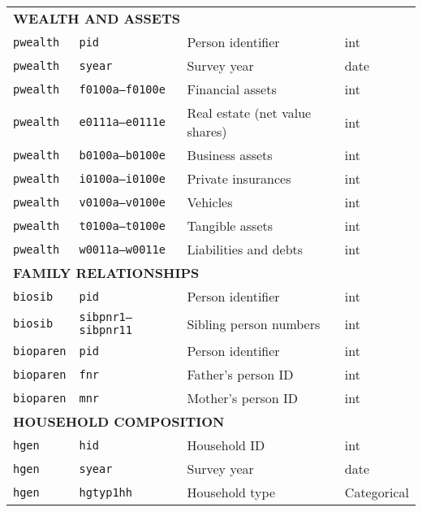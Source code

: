 {\begin{longtable}{llll}
\midrule
\multicolumn{4}{l}{\textbf{WEALTH AND ASSETS}} \\
\texttt{pwealth} & \texttt{pid} & Person identifier & int \\
\texttt{pwealth} & \texttt{syear} & Survey year & date \\
\texttt{pwealth} & \texttt{f0100a--f0100e} & Financial assets & int \\
\texttt{pwealth} & \texttt{e0111a--e0111e} & Real estate (net value shares) & int \\
\texttt{pwealth} & \texttt{b0100a--b0100e} & Business assets & int \\
\texttt{pwealth} & \texttt{i0100a--i0100e} & Private insurances & int \\
\texttt{pwealth} & \texttt{v0100a--v0100e} & Vehicles & int \\
\texttt{pwealth} & \texttt{t0100a--t0100e} & Tangible assets & int \\
\texttt{pwealth} & \texttt{w0011a--w0011e} & Liabilities and debts & int \\

\midrule
\multicolumn{4}{l}{\textbf{FAMILY RELATIONSHIPS}} \\
\texttt{biosib} & \texttt{pid} & Person identifier & int \\
\texttt{biosib} & \texttt{sibpnr1--sibpnr11} & Sibling person numbers & int \\
\texttt{bioparen} & \texttt{pid} & Person identifier & int \\
\texttt{bioparen} & \texttt{fnr} & Father’s person ID & int \\
\texttt{bioparen} & \texttt{mnr} & Mother’s person ID & int \\

\midrule
\multicolumn{4}{l}{\textbf{HOUSEHOLD COMPOSITION}} \\
\texttt{hgen} & \texttt{hid} & Household ID & int \\
\texttt{hgen} & \texttt{syear} & Survey year & date \\
\texttt{hgen} & \texttt{hgtyp1hh} & Household type & Categorical \\

\end{longtable}
}
